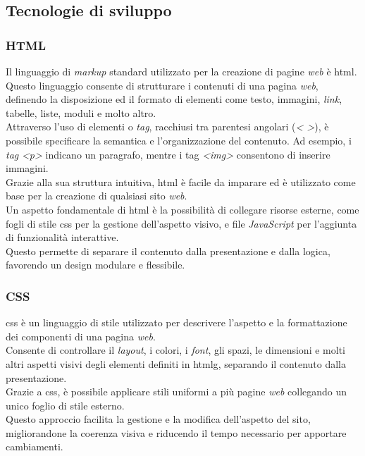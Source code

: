 \subsection{Tecnologie di sviluppo}
\label{sez:tecnologie-sviluppo}

\subsubsection{HTML}

Il linguaggio di \textit{markup} standard utilizzato per la creazione di pagine \textit{web} è \gls{html}. \\
Questo linguaggio consente di strutturare i contenuti di una pagina \textit{web}, definendo la disposizione ed il formato di elementi come testo, immagini, \textit{link}, tabelle, liste, moduli e molto altro.\\

\noindent Attraverso l’uso di elementi o \textit{tag}, racchiusi tra parentesi angolari (\textit{< >}), è possibile specificare la semantica e l’organizzazione del contenuto. 
Ad esempio, i \textit{tag} \textit{<p>} indicano un paragrafo, mentre i tag \textit{<img>} consentono di inserire immagini. \\
Grazie alla sua struttura intuitiva, \gls{html} è facile da imparare ed è utilizzato come base per la creazione di qualsiasi sito \textit{web}.\\

\noindent Un aspetto fondamentale di \gls{html} è la possibilità di collegare risorse esterne, come fogli di stile \gls{css} per la gestione dell’aspetto visivo, e file \textit{JavaScript} per l’aggiunta di funzionalità interattive. \\
Questo permette di separare il contenuto dalla presentazione e dalla logica, favorendo un design modulare e flessibile.

\subsubsection{CSS}
\gls{css} è un linguaggio di stile utilizzato per descrivere l’aspetto e la formattazione dei componenti di una pagina \textit{web}. \\
Consente di controllare il \textit{layout}, i colori, i \textit{font}, gli spazi, le dimensioni e molti altri aspetti visivi degli elementi definiti in \gls{htmlg}, separando il contenuto dalla presentazione.\\

\noindent Grazie a \gls{css}, è possibile applicare stili uniformi a più pagine \textit{web} collegando un unico foglio di stile esterno.\\
Questo approccio facilita la gestione e la modifica dell’aspetto del sito, migliorandone la coerenza visiva e riducendo il tempo necessario per apportare cambiamenti.

